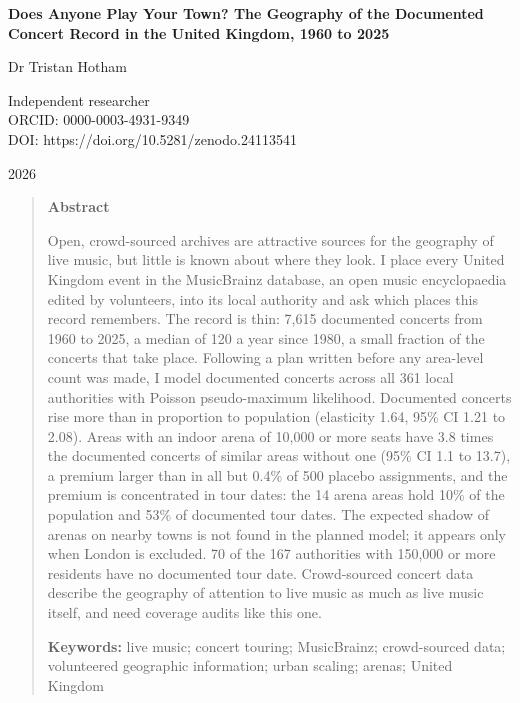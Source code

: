 \documentclass[11pt,a4paper]{article}
\begin{document}
\begin{center}
{\Large\bfseries Does Anyone Play Your Town? The Geography of the Documented Concert Record in the United Kingdom, 1960 to 2025\par}
\vspace{1.2em}
{\large Dr Tristan Hotham\par}
\vspace{0.3em}
{\small Independent researcher\\
ORCID: 0000-0003-4931-9349\\
DOI: https://doi.org/10.5281/zenodo.24113541\par}
\vspace{0.8em}
2026
\end{center}

\begin{quote}
\small
\begin{center}\textbf{Abstract}\end{center}
Open, crowd-sourced archives are attractive sources for the geography of live music, but little is known about where they look. I place every United Kingdom event in the MusicBrainz database, an open music encyclopaedia edited by volunteers, into its local authority and ask which places this record remembers. The record is thin: 7,615 documented concerts from 1960 to 2025, a median of 120 a year since 1980, a small fraction of the concerts that take place. Following a plan written before any area-level count was made, I model documented concerts across all 361 local authorities with Poisson pseudo-maximum likelihood. Documented concerts rise more than in proportion to population (elasticity 1.64, 95\% CI 1.21 to 2.08). Areas with an indoor arena of 10,000 or more seats have 3.8 times the documented concerts of similar areas without one (95\% CI 1.1 to 13.7), a premium larger than in all but 0.4\% of 500 placebo assignments, and the premium is concentrated in tour dates: the 14 arena areas hold 10\% of the population and 53\% of documented tour dates. The expected shadow of arenas on nearby towns is not found in the planned model; it appears only when London is excluded. 70 of the 167 authorities with 150,000 or more residents have no documented tour date. Crowd-sourced concert data describe the geography of attention to live music as much as live music itself, and need coverage audits like this one.

\textbf{Keywords:} live music; concert touring; MusicBrainz; crowd-sourced data; volunteered geographic information; urban scaling; arenas; United Kingdom
\end{quote}
\end{document}
